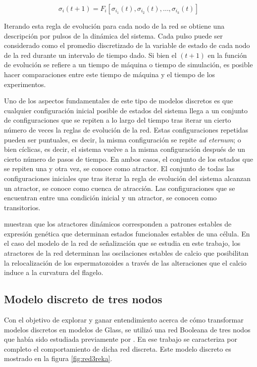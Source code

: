\begin{equation}\label{eqn:kaufman}
\sigma_i(t+1) = F_i[\sigma_{i_1}(t), \sigma_{i_2}(t),\ldots, \sigma_{i_k}(t)]
\end{equation}

Iterando esta regla de evolución para cada nodo de la red se obtiene una descripción por pulsos de la dinámica del sistema. Cada pulso puede ser considerado como el promedio discretizado de la variable de estado de cada nodo de la red durante un intervalo de tiempo dado. Si bien el $(t+1)$ en la función de evolución se refiere a un tiempo de máquina o tiempo de simulación, es posible hacer comparaciones entre este tiempo de máquina y el tiempo de los experimentos.

Uno de los aspectos fundamentales de este tipo de modelos discretos es que cualquier configuración inicial posible de estados del sistema llega a un conjunto de configuraciones que se repiten a lo largo del tiempo tras iterar un cierto número de veces la reglas de evolución de la red. Estas configuraciones repetidas pueden ser puntuales, es decir, la misma configuración se repite \emph{ad eternum}; o bien cíclicas, es decir, el sistema vuelve a la misma configuración después de un cierto número de pasos de tiempo. En ambos casos, el conjunto de los estados que se repiten una y otra vez, se conoce como atractor. El conjunto de todas las configuraciones iniciales que tras iterar la regla de evolución del sistema alcanzan un atractor, se conoce como cuenca de atracción. Las configuraciones que se encuentran entre una condición inicial y un atractor, se conocen como transitorios.

\citeauthor{huang2005} \citep{huang2005} muestran que los atractores din\'amicos corresponden a patrones estables de expresi\'on gen\'etica que determinan estados funcionales estables de una c\'elula. En el caso del modelo de la red de se\~nalizaci\'on que se estudia en este trabajo, los atractores de la red determinan las oscilaciones estables de calcio que posibilitan la relocalizaci\'on de los espermatozoides a trav\'es de las alteraciones que el calcio induce a la curvatura del flagelo.

\subsection{Modelo discreto de tres nodos}\label{sect:3nodos}


Con el objetivo de explorar y ganar entendimiento acerca de cómo transformar modelos discretos en modelos de Glass, se utilizó una red Booleana de tres nodos que había sido estudiada previamente por \citeauthor{Reka3Nodos2010}. En ese trabajo se caracteriza por completo el comportamiento de dicha red discreta. Este modelo discreto es mostrado en la figura \ref{fig:red3reka}.

